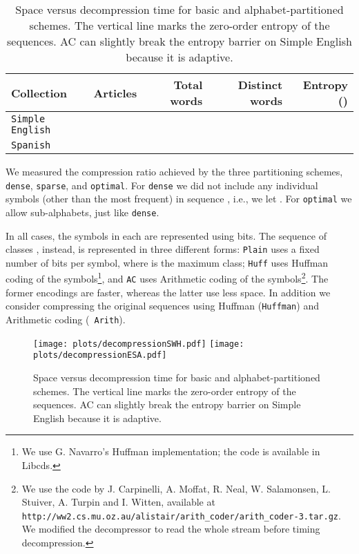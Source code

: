 \documentclass[11pt]{article}
\begin{document}
\begin{table}[t]
{\begin{tabular}
\begin{table}
\begin{center}
\begin{tabular}{l|r|r|r|r}
Collection & Articles & Total words  & Distinct words 
& Entropy () \\ \hline
{\tt Simple English} &  &  &  &  \\
{\tt Spanish} &  &  &  &  
\end{tabular}
\caption{Main characteristics of the datasets used.}
\label{tab:data}
\end{center}
\end{table}

We measured the compression ratio achieved by the three partitioning
schemes, {\tt dense}, {\tt sparse}, and {\tt optimal}. For {\tt dense} we
did not include any individual symbols (other than the most frequent) in
sequence , i.e., we let . For {\tt optimal} we 
allow  sub-alphabets, just like {\tt dense}.

In all cases, the symbols in each  are represented using  bits. The sequence of classes , instead, is represented
in three different forms: {\tt Plain} uses a fixed number of bits per symbol,
 where  is the maximum class; {\tt Huff} uses
Huffman coding of the symbols\footnote{We use G. Navarro's Huffman
implementation; the code is available in {\sc Libcds}.}, and {\tt AC} uses
Arithmetic coding of the symbols\footnote{We use the code by J. Carpinelli,
A. Moffat, R. Neal, W. Salamonsen, L. Stuiver, A. Turpin
and I. Witten, available at 
{\tt http://ww2.cs.mu.oz.au/alistair/arith\_coder/arith\_coder-3.tar.gz}.
We modified the decompressor to read the whole
stream before timing decompression.}. The former encodings are faster,
whereas the latter use less space. In addition we consider compressing the
original sequences using Huffman ({\tt Huffman}) and Arithmetic coding ({\tt
Arith}).

\begin{figure}[tb]
\centerline{\texttt{[image: plots/decompressionSWH.pdf]}
\texttt{[image: plots/decompressionESA.pdf]}}
\caption{Space versus decompression time for basic and alphabet-partitioned
schemes. The vertical line marks the zero-order entropy of the sequences. AC
can slightly break the entropy barrier on Simple English because it is 
adaptive.}
\label{fig:spacetime}
\end{figure}


\end{tabular}}
\end{table}
\end{document}
